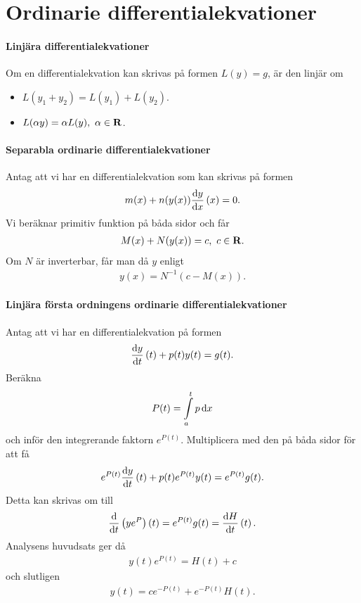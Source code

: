 \section{Ordinarie differentialekvationer}

\paragraph{Linjära differentialekvationer}
Om en differentialekvation kan skrivas på formen $L(y) = g$, är den linjär om
\begin{itemize}
	\item $L(y_1 + y_2) = L(y_1) + L(y_2)$.
	\item $L(\alpha y) = \alpha L(y),\ \alpha\in\R$.
\end{itemize}

\paragraph{Separabla ordinarie differentialekvationer}
Antag att vi har en differentialekvation som kan skrivas på formen
\begin{align*}
	m(x) + n(y(x))\dv{y}{x} \left(x\right) = 0.
\end{align*}
Vi beräknar primitiv funktion på båda sidor och får
\begin{align*}
	M(x) + N(y(x)) = c,\ c\in\mathbf{R}.
\end{align*}
Om $N$ är inverterbar, får man då $y$ enligt
\begin{align*}
	y(x) = N^{-1}(c - M(x)).
\end{align*}

\paragraph{Linjära första ordningens ordinarie differentialekvationer}
Antag att vi har en differentialekvation på formen
\begin{align*}
	\dv{y}{t} \left(t\right) + p(t)y(t) = g(t).
\end{align*}
Beräkna
\begin{align*}
	P(t) = \int\limits_{a}^{t}p\dd{x}
\end{align*}
och inför den integrerande faktorn $e^{P(t)}$. Multiplicera med den på båda sidor för att få
\begin{align*}
	e^{P(t)}\dv{y}{t} \left(t\right) + p(t)e^{P(t)}y(t) = e^{P(t)}g(t).
\end{align*}
Detta kan skrivas om till
\begin{align*}
	\dv{t}\left(ye^{P}\right)(t) = e^{P(t)}g(t) = \dv{H}{t} \left(t\right).
\end{align*}
Analysens huvudsats ger då
\begin{align*}
	y(t)e^{P(t)} = H(t) + c
\end{align*}
och slutligen
\begin{align*}
	y(t) = ce^{-P(t)} + e^{-P(t)}H(t).
\end{align*}

